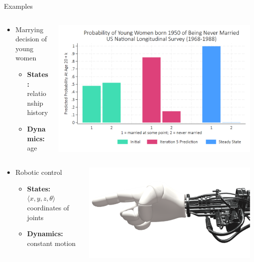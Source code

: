 \documentclass[11pt,table]{beamer}
\begin{document}
\begin{frame}{Examples}
    \begin{columns}[T]
\begin{column}{0.5\textwidth}
\begin{itemize}
    \item  Marrying decision of young women
\begin{itemize}
\item  \textbf{States:}	relationship history
\item \textbf{Dynamics:} age
\end{itemize}

\end{itemize}
\end{column}
\begin{column}{0.45\textwidth}
\centering
\includegraphics[width=.8\textwidth]{figures/never married.png}
\end{column}
\end{columns}
\pause
    \begin{columns}[T]
\begin{column}{0.5\textwidth}
\begin{itemize}
    \item  Robotic control
\begin{itemize}
\item  \textbf{States:}	$\langle x, y, z,\theta\rangle$
coordinates of joints
\item \textbf{Dynamics:} constant motion
\end{itemize}

\end{itemize}
\end{column}
\begin{column}{0.45\textwidth}
\centering
\includegraphics[width=.8\textwidth]{figures/15.png}
\end{column}
\end{columns}
\pause


\end{frame}
\end{document}
